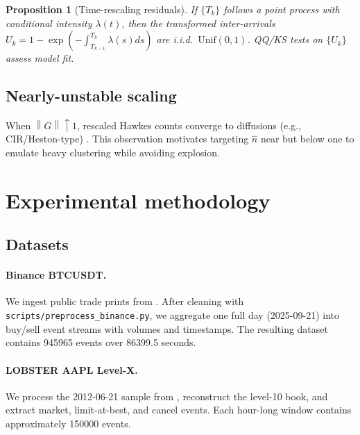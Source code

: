 \documentclass[11pt]{article}
\newtheorem{proposition}[theorem]{Proposition}
\newcommand{\1}{\mathbbm{1}}
\newcommand{\Norm}[1]{\left\lVert#1\right\rVert}
\begin{document}
\begin{proposition}[Time-rescaling residuals]
If $\{T_k\}$ follows a point process with conditional intensity $\lambda(t)$, then the transformed inter-arrivals $U_k=1-\exp\!\left(-\int_{T_{k-1}}^{T_k}\lambda(s)ds\right)$ are i.i.d.\ $\mathrm{Unif}(0,1)$. QQ/KS tests on $\{U_k\}$ assess model fit.
\end{proposition}

\subsection{Nearly-unstable scaling}
When $\Norm{G}\uparrow 1$, rescaled Hawkes counts converge to diffusions (e.g., CIR/Heston-type) \cite{JaissonRosenbaum2015}. This observation motivates targeting $\hat n$ near but below one to emulate heavy clustering while avoiding explosion.

\section{Experimental methodology}\label{sec:methodology}
\subsection{Datasets}
\paragraph{Binance BTCUSDT.} We ingest public trade prints from \cite{BinanceData}. After cleaning with \texttt{scripts/preprocess\_binance.py}, we aggregate one full day (2025-09-21) into buy/sell event streams with volumes and timestamps. The resulting dataset contains \num{945965} events over \num{86399.5} seconds.

\paragraph{LOBSTER AAPL Level-X.} We process the 2012-06-21 sample from \cite{LOBSTER}, reconstruct the level-10 book, and extract market, limit-at-best, and cancel events. Each hour-long window contains approximately \num{150000} events.
\end{document}
